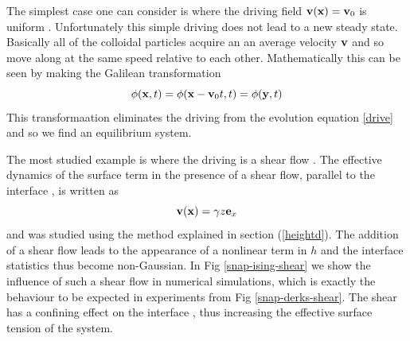 The simplest case one can consider is where the driving field ${\bf v}({\bf x}) ={\bf v}_0$ is uniform \cite{leung_field_1986.bray_coarsening_2000}. Unfortunately this simple driving does not lead to a new steady state. Basically all of the colloidal particles acquire an an average velocity ${\bf v}$ and so move along at the same speed relative to each other. Mathematically this can be seen by making the Galilean transformation
\begin{equation}
    \phi ({\bf x},t)= \phi({\bf x}-{\bf v}_0t,t) = \phi({\bf y},t)
\end{equation}
This transformaation eliminates the driving from the evolution equation \eqref{drive} and so we find an equilibrium system. 

The most studied example is where the driving is a shear flow \cite{derks_suppression_2006,thiebaud_nonequilibrium_2010}. The effective dynamics of the surface term in the presence of a shear flow, parallel to the interface \cite{bray_interface_2001,bray_interface_2001-1,}, is written as
\begin{equation}
    {\bf v}({\bf x}) = \gamma z {\bf e}_x
    \label{eq-cisaillement}
\end{equation}
and was studied using the method explained in section (\ref{heightd}). The addition of a shear flow leads to the appearance of a nonlinear term in $h$ and the interface statistics thus become non-Gaussian. {\color{purple}In Fig \ref{snap-ising-shear} we show the influence of such a shear flow in numerical simulations, which is exactly the behaviour to be expected in experiments from Fig \ref{snap-derks-shear}. The shear has a confining effect on the interface \cite{smith_driven_2010,smith_interfaces_2008-1,smith_interfaces_2008}, thus increasing the effective surface tension of the system.}

